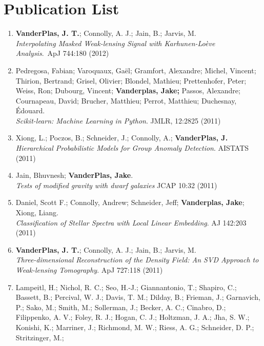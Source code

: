 {\section*{Publication List}
\begin{enumerate}
   \item {\bf VanderPlas, J. T.}; Connolly, A. J.; Jain, B.; Jarvis, M.\\
         {\it Interpolating Masked Weak-lensing Signal
          with Karhunen-Loève Analysis}.\
         ApJ 744:180 (2012)
   \item Pedregosa, Fabian; Varoquaux, Gaël; Gramfort, Alexandre;
         Michel, Vincent; Thirion, Bertrand; Grisel, Olivier;
         Blondel, Mathieu; Prettenhofer, Peter; Weiss, Ron; Dubourg, Vincent;
         {\bf Vanderplas, Jake;} Passos, Alexandre; Cournapeau, David;
         Brucher, Matthieu; Perrot, Matthieu; Duchesnay, Édouard.\\
         {\it Scikit-learn: Machine Learning in Python}.
         JMLR, 12:2825 (2011)
   \item Xiong, L.; Poczos, B.; Schneider, J.; Connolly, A.;
         {\bf VanderPlas, J.}\\
         {\it Hierarchical Probabilistic Models for Group Anomaly Detection}.
         AISTATS (2011)
   \item Jain, Bhuvnesh; {\bf VanderPlas, Jake}.\\
         {\it Tests of modified gravity with dwarf galaxies}
         JCAP 10:32 (2011)
   \item Daniel, Scott F.; Connolly, Andrew; Schneider, Jeff;
         {\bf Vanderplas, Jake}; Xiong, Liang.\\
         {\it Classification of Stellar Spectra with Local Linear Embedding}.
         AJ 142:203 (2011)
   \item {\bf VanderPlas, J. T.}; Connolly, A. J.; Jain, B.; Jarvis, M.\\
         {\it Three-dimensional Reconstruction of the Density Field:
              An SVD Approach to Weak-lensing Tomography}.
         ApJ 727:118 (2011)
   \item Lampeitl, H.; Nichol, R. C.; Seo, H.-J.; Giannantonio, T.;
         Shapiro, C.; Bassett, B.; Percival, W. J.; Davis, T. M.; Dilday, B.;
         Frieman, J.; Garnavich, P.; Sako, M.; Smith, M.; Sollerman, J.;
         Becker, A. C.; Cinabro, D.; Filippenko, A. V.; Foley, R. J.;
         Hogan, C. J.; Holtzman, J. A.; Jha, S. W.; Konishi, K.; Marriner, J.;
         Richmond, M. W.; Riess, A. G.; Schneider, D. P.; Stritzinger, M.;

\end{enumerate}}
